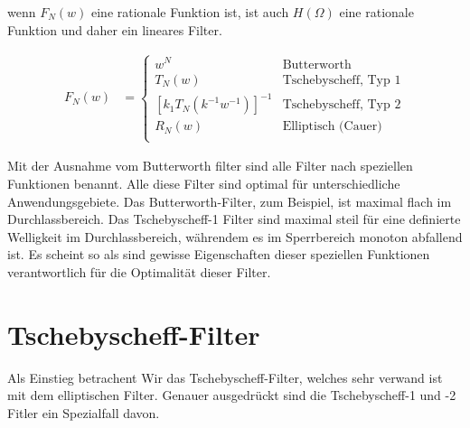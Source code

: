 \begin{refsection}
wenn $F_N(w)$ eine rationale Funktion ist, ist auch $H(\Omega)$ eine rationale Funktion und daher ein lineares Filter. %

\begin{align}
    F_N(w) & =
    \begin{cases}
        w^N                            & \text{Butterworth} \\
        T_N(w)                         & \text{Tschebyscheff, Typ 1}  \\
        [k_1 T_N (k^{-1} w^{-1})]^{-1} & \text{Tschebyscheff, Typ 2}  \\
        R_N(w)                         & \text{Elliptisch (Cauer)}    \\
    \end{cases}
\end{align}

Mit der Ausnahme vom Butterworth filter sind alle Filter nach speziellen Funktionen benannt.
Alle diese Filter sind optimal für unterschiedliche Anwendungsgebiete.
Das Butterworth-Filter, zum Beispiel, ist maximal flach im Durchlassbereich.
Das Tschebyscheff-1 Filter sind maximal steil für eine definierte Welligkeit im Durchlassbereich, währendem es im Sperrbereich monoton abfallend ist.
Es scheint so als sind gewisse Eigenschaften dieser speziellen Funktionen verantwortlich für die Optimalität dieser Filter.

\section{Tschebyscheff-Filter}

Als Einstieg betrachent Wir das Tschebyscheff-Filter, welches sehr verwand ist mit dem elliptischen Filter.
Genauer ausgedrückt sind die Tschebyscheff-1 und -2 Fitler ein Spezialfall davon.


\end{refsection}
